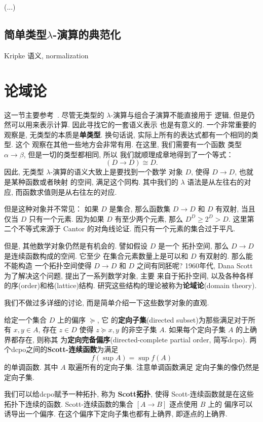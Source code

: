 (...)

\subsection{简单类型\texorpdfstring{\(\lambda\)}{Lambda}-演算的典范化}
Kripke 语义, normalization

\section{论域论}\label{beginning:domain}

这一节主要参考~\cites{abramsky:1995:domain}{cartwright:2016:domain}.
尽管无类型的 \(\lambda\)-演算与组合子演算不能直接用于
逻辑, 但是仍然可以用来表示计算. 因此寻找它的一套语义表示
也是有意义的. 一个非常重要的观察是, 无类型的本质是\textbf{单类型}.
换句话说, 实际上所有的表达式都有一个相同的类型. 这个
观察在其他一些地方会非常有用. 在这里, 我们需要有一个函数
类型 \(\alpha \to \beta\), 但是一切的类型都相同, 所以
我们就顺理成章地得到了一个等式：
\[(D \to D) \cong D.\]
因此, 无类型 \(\lambda\)-演算的语义大致上是要找到一个数学
对象 \(D\), 使得 \(D \to D\), 也就是某种函数或者映射
的空间, 满足这个同构. 其中我们的 \(\lambda\)
语法是从左往右的对应, 而函数求值则是从右往左的对应.

但是这种对象并不常见： 如果 \(D\) 是集合, 那么函数集
\(D \to D\)
和 \(D\) 有双射, 当且仅当 \(D\) 只有一个元素. 因为如果
\(D\) 有至少两个元素, 那么
\(D^D \ge 2^D > D\).
这里第二个不等式来源于 Cantor 的对角线论证.
而只有一个元素的集合过于平凡.

但是, 其他数学对象仍然是有机会的. 譬如假设 \(D\) 是一个
拓扑空间, 那么 \(D \to D\) 是连续函数构成的空间. 它至少
在集合元素数量上是可以和 \(D\) 有双射的. 那么能不能构造
一个拓扑空间使得 \(D \to D\) 和 \(D\) 之间有同胚呢?
1960年代, Dana Scott 为了解决这个问题, 提出了一系列数学对象, 主要
来自于拓扑空间, 以及各种各样的序(order)和格(lattice)结构.
研究这些结构的理论被称为\textbf{论域论}(domain theory).

我们不做过多详细的讨论, 而是简单介绍一下这些数学对象的直观.
\begin{definition}
给定一个集合 \(D\) 上的偏序 \(\succeq\), 它
的\textbf{定向子集}(directed subset)为那些满足对于所有 \(x,y\in A\),
存在 \(z \in D\) 使得 \(z \succeq x, y\) 的非空子集
\(A\). 如果每个定向子集 \(A\) 的上确界都存在, 则称其
为\textbf{定向完备偏序}(directed-complete partial order, 简写dcpo).
两个dcpo之间的\textbf{Scott-连续函数}为满足
\[f\left(\sup A\right) = \sup f(A)\]
的单调函数. 其中 \(A\) 取遍所有的定向子集. 注意单调函数满足
定向子集的像仍然是定向子集.
\end{definition}
我们可以给dcpo赋予一种拓扑, 称为 \textbf{Scott拓扑},
使得 Scott-连续函数就是在这些拓扑下连续的函数.
Scott-连续函数的集合 \([A \to B]\) 逐点使用 \(B\) 上的
偏序可以诱导出一个偏序. 在这个偏序下定向子集也都有上确界,
即逐点的上确界.

